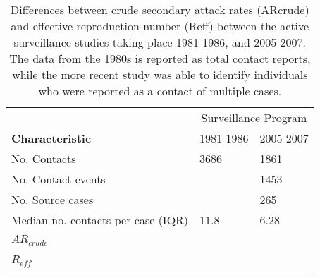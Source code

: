 \begin{table} %
\centering %
\caption{Differences between crude secondary attack rates (ARcrude) and effective reproduction number (Reff) between the active surveillance studies taking place 1981-1986, and 2005-2007. The data from the 1980s is reported as total contact reports, while the more recent study was able to identify individuals who were reported as a contact of multiple cases.} %
\begin{tabular}{p{7cm} p{3cm} p{3cm}} %
\toprule %
& \multicolumn{2}{c}{Surveillance Program} \\ %
\cmidrule(l){2-3} %
\textbf{Characteristic} & 1981-1986 & 2005-2007 \\ %
\midrule %
No. Contacts & 3686 & 1861 \\ %
No. Contact events & - & 1453 \\ %
No. Source cases & ~ & 265 \\ %
Median no. contacts per case (IQR) & 11.8 & 6.28 \\ %
$AR_{crude}$ & ~ & ~ \\ %
$R_{eff}$ & ~ & ~ \\
\bottomrule %
\end{tabular}
\end{table}